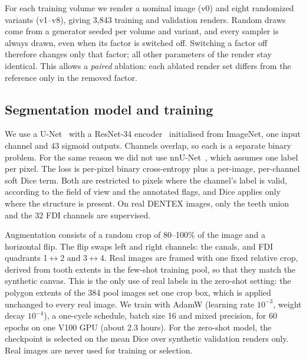 \documentclass[preprint,12pt]{elsarticle}
\begin{document}
For each training volume we render a nominal image (v0) and eight randomized variants (v1--v8), giving 3,843 training and
validation renders. Random draws come from a generator seeded per volume and variant, and every sampler is always drawn,
even when its factor is switched off. Switching a factor off therefore changes only that factor; all other parameters of
the render stay identical. This allows a \emph{paired} ablation: each ablated render set differs from the reference only
in the removed factor.

\subsection{Segmentation model and training}
\label{sec:train}
We use a U-Net~\cite{ronneberger2015} with a ResNet-34 encoder~\cite{he2016} initialised from ImageNet, one input channel
and 43 sigmoid outputs. Channels overlap, so each is a separate binary problem. For the same reason we did not use
nnU-Net~\cite{isensee2021}, which assumes one label per pixel. The loss is per-pixel binary cross-entropy plus a
per-image, per-channel soft Dice term. Both are restricted to pixels where the channel's label is valid, according to the
field of view and the annotated flags, and Dice applies only where the structure is present. On real DENTEX images, only
the teeth union and the 32 FDI channels are supervised.

Augmentation consists of a random crop of 80--100\% of the image and a horizontal flip. The flip swaps left and right
channels: the canals, and FDI quadrants 1$\leftrightarrow$2 and 3$\leftrightarrow$4. Real images are framed with one
fixed relative crop, derived from tooth extents in the few-shot training pool, so that they match the synthetic canvas.
This is the only use of real labels in the zero-shot setting: the polygon extents of the 384 pool images set one crop
box, which is applied unchanged to every real image.
We train with AdamW (learning rate $10^{-3}$, weight decay $10^{-4}$), a one-cycle schedule, batch size 16 and mixed
precision, for 60 epochs on one V100 GPU (about 2.3 hours). For the zero-shot model, the checkpoint is selected on the
mean Dice over synthetic validation renders only. Real images are never used for training or selection.
\end{document}
